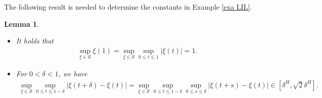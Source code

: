 \documentclass[11pt, reqno]{amsart}
\numberwithin{equation}{section}
\newtheorem{lemma}{Lemma}[section]
\newcommand{\1}{{\bf 1}}
\newcommand{\2}{{\bf 2}}
\begin{document}
 {
The following result is needed to determine the constants in Example \ref{exa LIL}.  }
\begin{lemma}\label{lem const}
\begin{itemize}
\item[(a)]  { It holds that }
\begin{align*}  {
\sup_{\xi \in \mathscr S}\xi(1) =\sup_{\xi \in \mathscr S}\sup_{0\le t\le 1}|\xi(t)|=1.  }
\end{align*}
\item[(b)]   {For $0<\delta<1$, we have }
\begin{align*}  {
\sup_{\xi \in \mathscr S}\sup_{0\le t\le 1-\delta}|\xi(t+\delta)-\xi(t)|   = \sup_{\xi \in \mathscr S}\sup_{0\le t\le 1-\delta}\sup_{0\le s\le \delta}|\xi(t+s)-\xi(t)| \in \left[\delta^H, \sqrt{2}\delta^H\right]. }
\end{align*}
 \end{itemize}
\end{lemma}
\end{document}
